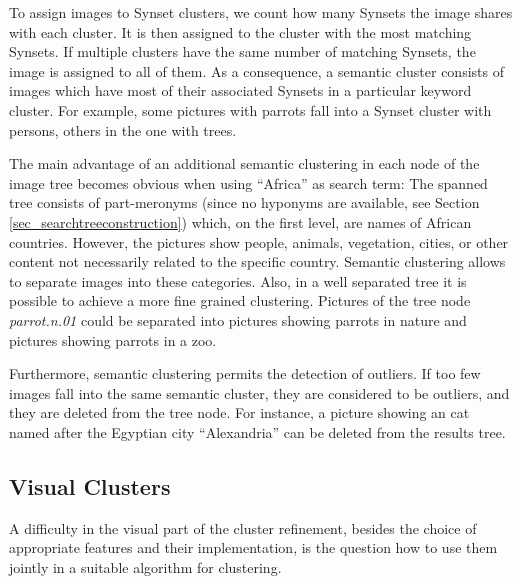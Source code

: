 \bigskip
To assign images to Synset clusters, we count how many Synsets the image shares with each cluster. It is then assigned to the cluster with the most matching Synsets. If multiple clusters have the same number of matching Synsets, the image is assigned to all of them. As a consequence, a semantic cluster consists of images which have most of their associated Synsets in a particular keyword cluster. For example, some pictures with parrots fall into a Synset cluster with persons, others in the one with trees.

\bigskip
The main advantage of an additional semantic clustering in each node of the image tree becomes obvious when using ``Africa'' as search term: The spanned tree consists of part-meronyms (since no hyponyms are available, see Section \ref{sec_searchtreeconstruction}) which, on the first level, are names of African countries. However, the pictures show people, animals, vegetation, cities, or other content not necessarily related to the specific country. Semantic clustering allows to separate images into these categories. Also, in a well separated tree it is possible to achieve a more fine grained clustering. Pictures of the tree node \emph{parrot.n.01} could be separated into pictures showing parrots in nature and pictures showing parrots in a zoo.

Furthermore, semantic clustering permits the detection of outliers. If too few images fall into the same semantic cluster, they are considered to be outliers, and they are deleted from the tree node. For instance, a picture showing an cat named after the Egyptian city ``Alexandria'' can be deleted from the results tree.

\subsection{Visual Clusters}
\label{sec_visualclustering}

A difficulty in the visual part of the cluster refinement, besides the choice of appropriate features and their implementation, is the question how to use them jointly in a suitable algorithm for clustering.


